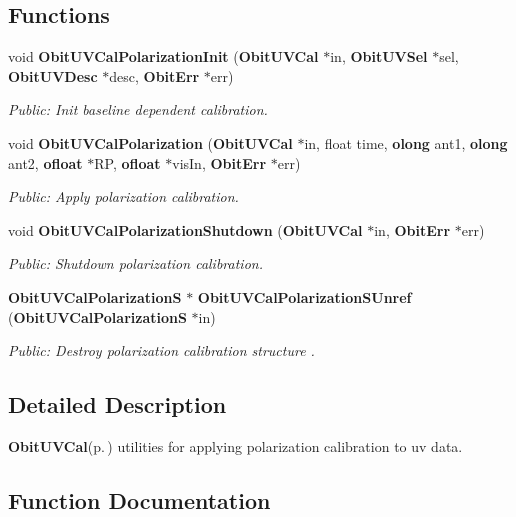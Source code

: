 \subsection*{Functions}
\begin{CompactItemize}
\item 
void {\bf Obit\-UVCal\-Polarization\-Init} ({\bf Obit\-UVCal} $\ast$in, {\bf Obit\-UVSel} $\ast$sel, {\bf Obit\-UVDesc} $\ast$desc, {\bf Obit\-Err} $\ast$err)
\begin{CompactList}\small\item\em Public: Init baseline dependent calibration. \item\end{CompactList}\item 
void {\bf Obit\-UVCal\-Polarization} ({\bf Obit\-UVCal} $\ast$in, float time, {\bf olong} ant1, {\bf olong} ant2, {\bf ofloat} $\ast$RP, {\bf ofloat} $\ast$vis\-In, {\bf Obit\-Err} $\ast$err)
\begin{CompactList}\small\item\em Public: Apply polarization calibration. \item\end{CompactList}\item 
void {\bf Obit\-UVCal\-Polarization\-Shutdown} ({\bf Obit\-UVCal} $\ast$in, {\bf Obit\-Err} $\ast$err)
\begin{CompactList}\small\item\em Public: Shutdown polarization calibration. \item\end{CompactList}\item 
{\bf Obit\-UVCal\-Polarization\-S} $\ast$ {\bf Obit\-UVCal\-Polarization\-SUnref} ({\bf Obit\-UVCal\-Polarization\-S} $\ast$in)
\begin{CompactList}\small\item\em Public: Destroy polarization calibration structure . \item\end{CompactList}\end{CompactItemize}


\subsection{Detailed Description}
{\bf Obit\-UVCal}{\rm (p.\,\pageref{structObitUVCal})} utilities for applying polarization calibration to uv data. 



\subsection{Function Documentation}
